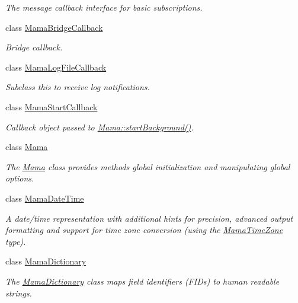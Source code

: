 \begin{DoxyCompactItemize}
\begin{DoxyCompactList}\small\item\em The message callback interface for basic subscriptions. \item\end{DoxyCompactList}\item 
class \hyperlink{classWombat_1_1MamaBridgeCallback}{MamaBridgeCallback}
\begin{DoxyCompactList}\small\item\em Bridge callback. \item\end{DoxyCompactList}\item 
class \hyperlink{classWombat_1_1MamaLogFileCallback}{MamaLogFileCallback}
\begin{DoxyCompactList}\small\item\em Subclass this to receive log notifications. \item\end{DoxyCompactList}\item 
class \hyperlink{classWombat_1_1MamaStartCallback}{MamaStartCallback}
\begin{DoxyCompactList}\small\item\em Callback object passed to \hyperlink{classWombat_1_1Mama_a3fe589a62f5cd705944b8ea6215b4aa3}{Mama::startBackground()}. \item\end{DoxyCompactList}\item 
class \hyperlink{classWombat_1_1Mama}{Mama}
\begin{DoxyCompactList}\small\item\em The {\ttfamily \hyperlink{classWombat_1_1Mama}{Mama}} class provides methods global initialization and manipulating global options. \item\end{DoxyCompactList}\item 
class \hyperlink{classWombat_1_1MamaDateTime}{MamaDateTime}
\begin{DoxyCompactList}\small\item\em A date/time representation with additional hints for precision, advanced output formatting and support for time zone conversion (using the \hyperlink{classWombat_1_1MamaTimeZone}{MamaTimeZone} type). \item\end{DoxyCompactList}\item 
class \hyperlink{classWombat_1_1MamaDictionary}{MamaDictionary}
\begin{DoxyCompactList}\small\item\em The {\ttfamily \hyperlink{classWombat_1_1MamaDictionary}{MamaDictionary}} class maps field identifiers (FIDs) to human readable strings. \item\end{DoxyCompactList}\item 

\end{DoxyCompactItemize}
